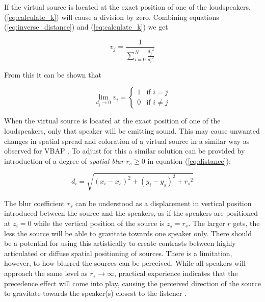 \documentclass[twoside,10pt]{article}
\begin{document}
If the virtual source is located at the exact position of one of the loudspeakers, (\ref{eq:calculate_k}) will cause a division by zero. Combining equations (\ref{eq:inverse_distance}) and (\ref{eq:calculate_k}) we get

\begin{equation}
v_{j} = \frac{1}{\sum_{i=0}^{N} \frac{{d_{j}}^2}{{d_{i}}^2}}
\end{equation}

From this it can be shown that

\begin{equation} \label{eq:distance_zero}
\lim_{d_{j} \rightarrow 0} v_{i} = 
\left\{ \begin{array}{ll} 
1 & \textrm{if $i=j$}\\ 
0 & \textrm{if $i \ne j$}
\end{array} \right.
\end{equation}

When the virtual source is located at the exact position of one of the loudspeakers, only that speaker will be emitting sound. This may cause unwanted changes in spatial spread and coloration of a virtual source in a similar way as observed for VBAP \cite{Pulkki:1999vbap}. To adjust for this a similar solution can be provided by introduction of a degree of \textit{spatial blur} $r_{s} \ge 0$ in equation (\ref{eq:distance}):

\begin{equation} \label{eq:mod_distance}
d_{i} = \sqrt{ {(x_{i} - x_{s})}^2 + {(y_{i} - y_{s})}^2 + {r_{s}}^2}
\end{equation}

The blur coefficient $r_{s}$ can be understood as a displacement in vertical position introduced between the source and the speakers, as if the speakers are positioned at $z_{i}=0$ while the vertical position of the source is $z_{s}=r_{s}$. The larger $r$ gets, the less the source will be able to gravitate towards one speaker only. There should be a potential for using this artistically to create contrasts between highly articulated or diffuse spatial positioning of sources.  There is a limitation, however, to how blurred the sources can be perceived.  While all speakers will approach the same level as $ r_{s} \rightarrow \infty $, practical experience indicates that the precedence effect will come into play, causing the perceived direction of the source to gravitate towards the speaker(s) closest to the listener \cite{Litovsky:1999precedence_effect}.

\end{document}
